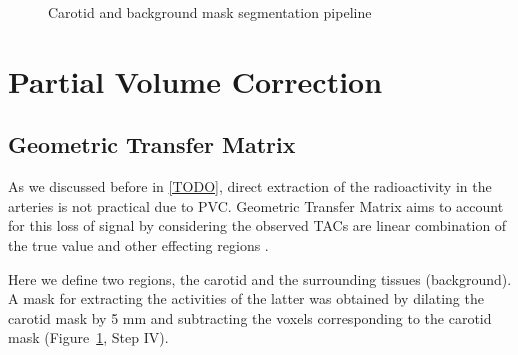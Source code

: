 \begin{figure}[h]
	\centering
	\caption{Carotid and background mask segmentation pipeline}
	\label{fig:seg_pipeline}
\end{figure}

\section{Partial Volume Correction}
\subsection{Geometric Transfer Matrix}
As we discussed before in \ref{TODO}, direct extraction of the radioactivity in the arteries is not practical due to PVC.
Geometric Transfer Matrix aims to account for this loss of signal by considering the observed TACs are linear combination of the true value and other effecting regions \cite{rousset1998correction}.

Here we define two regions, the carotid and the surrounding tissues (background).
A mask for extracting the activities of the latter was obtained by dilating the carotid mask by 5 mm and subtracting the voxels corresponding to the carotid mask (Figure~\ref{fig:seg_pipeline}, Step IV).

